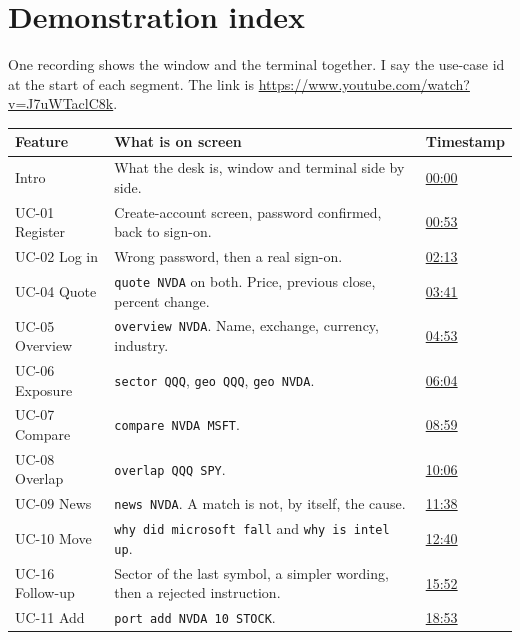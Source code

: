\documentclass[11pt]{article}
\begin{document}
\section{Demonstration index}
\label{sec:demos}

One recording shows the window and the terminal together. I say the use-case id at the start of each segment. The link is \url{https://www.youtube.com/watch?v=J7uWTaclC8k}.

\begin{center}
\small
\begin{tabularx}{\textwidth}{@{}p{2.2cm}Xp{2.2cm}@{}}
\toprule
Feature & What is on screen & Timestamp \\
\midrule
Intro & What the desk is, window and terminal side by side. &
\href{https://youtu.be/J7uWTaclC8k?t=0}{00:00} \\
UC-01 Register & Create-account screen, password confirmed, back to sign-on. &
\href{https://youtu.be/J7uWTaclC8k?t=53}{00:53} \\
UC-02 Log in & Wrong password, then a real sign-on. &
\href{https://youtu.be/J7uWTaclC8k?t=133}{02:13} \\
UC-04 Quote & \texttt{quote NVDA} on both. Price, previous close, percent change. &
\href{https://youtu.be/J7uWTaclC8k?t=221}{03:41} \\
UC-05 Overview & \texttt{overview NVDA}. Name, exchange, currency, industry. &
\href{https://youtu.be/J7uWTaclC8k?t=293}{04:53} \\
UC-06 Exposure & \texttt{sector QQQ}, \texttt{geo QQQ}, \texttt{geo NVDA}. &
\href{https://youtu.be/J7uWTaclC8k?t=364}{06:04} \\
UC-07 Compare & \texttt{compare NVDA MSFT}. &
\href{https://youtu.be/J7uWTaclC8k?t=539}{08:59} \\
UC-08 Overlap & \texttt{overlap QQQ SPY}. &
\href{https://youtu.be/J7uWTaclC8k?t=606}{10:06} \\
UC-09 News & \texttt{news NVDA}. A match is not, by itself, the cause. &
\href{https://youtu.be/J7uWTaclC8k?t=698}{11:38} \\
UC-10 Move & \texttt{why did microsoft fall} and \texttt{why is intel up}. &
\href{https://youtu.be/J7uWTaclC8k?t=760}{12:40} \\
UC-16 Follow-up & Sector of the last symbol, a simpler wording, then a rejected instruction. &
\href{https://youtu.be/J7uWTaclC8k?t=952}{15:52} \\
UC-11 Add & \texttt{port add NVDA 10 STOCK}. &
\href{https://youtu.be/J7uWTaclC8k?t=1133}{18:53} \\

\end{tabularx}
\end{center}
\end{document}
